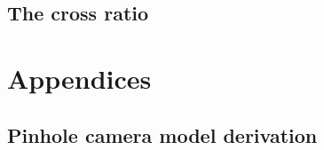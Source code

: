 \documentclass[a4paper]{article}
\begin{document}
\subsection{The cross ratio}


\newpage
\printbibliography



\newpage
\appendix

\section{Appendices}

\newpage
\subsection{Pinhole camera model derivation}
\label{app:pinhole_model_deriv}
\end{document}
